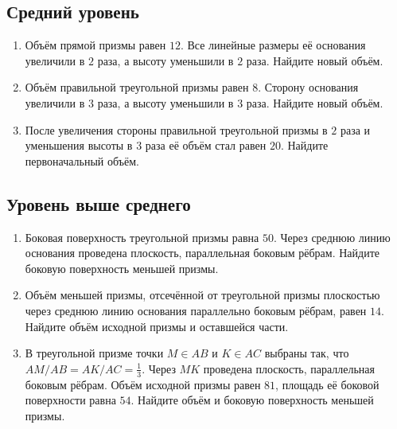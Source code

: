 \documentclass[a4paper,12pt]{article}
\begin{document}
\subsection*{Средний уровень}
\begin{enumerate}[start=5]
\item Объём прямой призмы равен $12$. Все линейные размеры её основания увеличили в $2$ раза, а высоту уменьшили в $2$ раза. Найдите новый объём.
\item Объём правильной треугольной призмы равен $8$. Сторону основания увеличили в $3$ раза, а высоту уменьшили в $3$ раза. Найдите новый объём.
\item После увеличения стороны правильной треугольной призмы в $2$ раза и уменьшения высоты в $3$ раза её объём стал равен $20$. Найдите первоначальный объём.
\end{enumerate}

\subsection*{Уровень выше среднего}
\begin{enumerate}[start=8]
\item Боковая поверхность треугольной призмы равна $50$. Через среднюю линию основания проведена плоскость, параллельная боковым рёбрам. Найдите боковую поверхность меньшей призмы.
\item Объём меньшей призмы, отсечённой от треугольной призмы плоскостью через среднюю линию основания параллельно боковым рёбрам, равен $14$. Найдите объём исходной призмы и оставшейся части.
\item В треугольной призме точки $M\in AB$ и $K\in AC$ выбраны так, что $AM/AB=AK/AC=\frac13$. Через $MK$ проведена плоскость, параллельная боковым рёбрам. Объём исходной призмы равен $81$, площадь её боковой поверхности равна $54$. Найдите объём и боковую поверхность меньшей призмы.
\end{enumerate}

\clearpage
\end{document}
